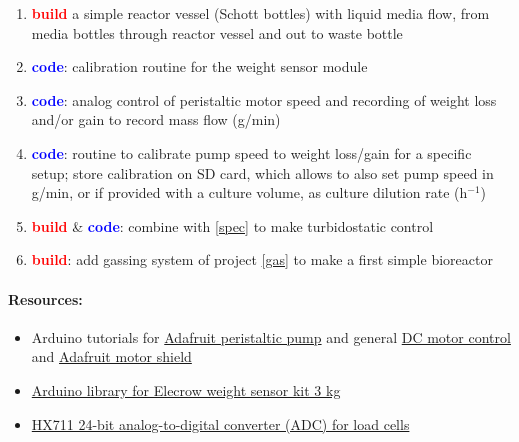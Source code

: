 \documentclass[12pt,a4paper]{scrartcl}
\newcommand{\build}[0]{\textcolor{red}{\textbf{build}}}
\newcommand{\code}[0]{\textcolor{blue}{\textbf{code}}}
\newcommand{\ph}[0]{h{\small$^{-1}$}}
\begin{document}
\begin{enumerate}
\item \build{} a simple reactor vessel (Schott bottles) with liquid
  media flow, from media bottles through reactor vessel and out to
  waste bottle 
\item \code{}: calibration routine for the weight sensor module
\item \code{}: analog control of peristaltic motor speed and recording of
  weight loss and/or gain to record mass flow (g/min)
\item \code{}: routine to calibrate pump speed to weight loss/gain
  for a specific setup; store calibration on SD card, which allows
  to also set pump speed in g/min, or if provided with a culture
  volume, as culture dilution rate (\ph{})
\item \build{} \& \code{}: combine with \ref{spec} to make
  turbidostatic control
\item \build{}: add gassing system of project \ref{gas} to make a first
  simple bioreactor
\end{enumerate}

\paragraph{Resources:}
\begin{itemize}
\item Arduino tutorials for
  \href{http://www.instructables.com/id/Control-peristaltic-pump-with-TA7291P-and-an-Ardui/}{Adafruit
    peristaltic pump} and general
  \href{http://playground.arduino.cc/TA7291PDCMOTORCONTROLLER/TA7291PDCMOTORCONTROLLER}{DC motor control} and \href{https://www.adafruit.com/products/1438}{Adafruit motor shield}
\item \href{http://www.elecrow.com/wiki/index.php?title=Weight_Sensor_Scales_Kit-_20KG}{Arduino library for Elecrow weight sensor kit 3 kg}
\item \href{https://cdn.sparkfun.com/datasheets/Sensors/ForceFlex/hx711_english.pdf}{HX711 24-bit analog-to-digital converter (ADC) for load cells}
\end{itemize}
\end{document}
